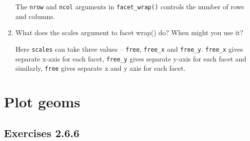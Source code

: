 \documentclass[]{book}
\begin{document}
\begin{enumerate}
  The \texttt{nrow} and \texttt{ncol} arguments in
  \texttt{facet\_wrap()} controls the number of rows and columns.
\item
  What does the scales argument to facet wrap() do? When might you use
  it?

  Here \texttt{scales} can take three values -- \texttt{free},
  \texttt{free\_x} and \texttt{free\_y}. \texttt{free\_x} gives separate
  x-axis for each facet, \texttt{free\_y} gives separate y-axis for each
  facet and similarly, \texttt{free} gives separate x and y axis for
  each facet.
\end{enumerate}

\section{Plot geoms}\label{plot-geoms}

\subsection{Exercises 2.6.6}\label{exercises-2.6.6}
\end{document}
